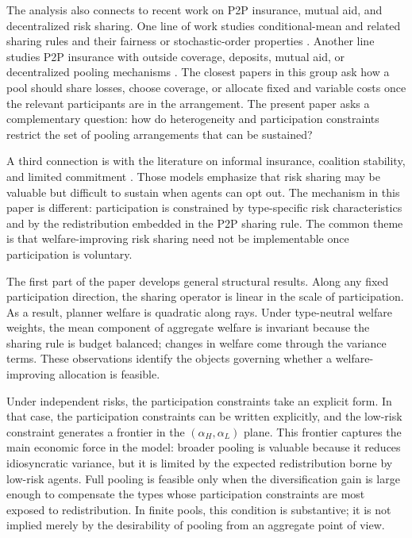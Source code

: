 \documentclass[a4paper,12pt]{article}
\theoremstyle{definition}
\theoremstyle{remark}
\newcommand{\1}{\mathbf{1}}
\begin{document}
The analysis also connects to recent work on P2P insurance, mutual aid, and decentralized risk sharing. One line of work studies conditional-mean and related sharing rules and their fairness or stochastic-order properties \citep{DenuitDhaene2012,Denuit2019,DenuitEtAl2023}. Another line studies P2P insurance with outside coverage, deposits, mutual aid, or decentralized pooling mechanisms \citep{abdikerimova2022peer,FengEtAl2023,LevantesiPiscopo2022,ChenFengMaoHu2024,BoonenChenHu2025}. The closest papers in this group ask how a pool should share losses, choose coverage, or allocate fixed and variable costs once the relevant participants are in the arrangement. The present paper asks a complementary question: how do heterogeneity and participation constraints restrict the set of pooling arrangements that can be sustained?

A third connection is with the literature on informal insurance, coalition stability, and limited commitment \citep{coate1993reciprocity,genicot2003group}. Those models emphasize that risk sharing may be valuable but difficult to sustain when agents can opt out. The mechanism in this paper is different: participation is constrained by type-specific risk characteristics and by the redistribution embedded in the P2P sharing rule. The common theme is that welfare-improving risk sharing need not be implementable once participation is voluntary.

The first part of the paper develops general structural results. Along any fixed participation direction, the sharing operator is linear in the scale of participation. As a result, planner welfare is quadratic along rays. Under type-neutral welfare weights, the mean component of aggregate welfare is invariant because the sharing rule is budget balanced; changes in welfare come through the variance terms. These observations identify the objects governing whether a welfare-improving allocation is feasible.

Under independent risks, the participation constraints take an explicit form. In that case, the participation constraints can be written explicitly, and the low-risk constraint generates a frontier in the \((\alpha_H,\alpha_L)\) plane. This frontier captures the main economic force in the model: broader pooling is valuable because it reduces idiosyncratic variance, but it is limited by the expected redistribution borne by low-risk agents. Full pooling is feasible only when the diversification gain is large enough to compensate the types whose participation constraints are most exposed to redistribution. In finite pools, this condition is substantive; it is not implied merely by the desirability of pooling from an aggregate point of view.
\end{document}
